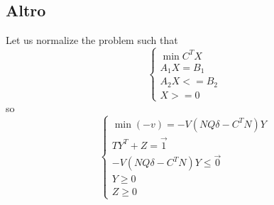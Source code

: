 \documentclass[a4paper,11pt]{article}
\begin{document}
\subsection{Altro}

Let us normalize the problem such that
\[
\left\{
\begin{array}{ll}
	\min C^T X \\
	A_1 X = B_1 \\
	A_2 X <= B_2 \\
	X >= 0
\end{array}
\right.
\]
so
\[
\left\{
\begin{array}{ll}
	\min (-v) = -V \left( N Q \delta - C^T N \right) Y \\
	T Y^T + Z = \vec{1} \\
	-V \left( N Q \delta - C^T N \right) Y \le \vec{0} \\
	Y \ge 0 \\
	Z \ge 0
\end{array}
\right.
\]
\end{document}
